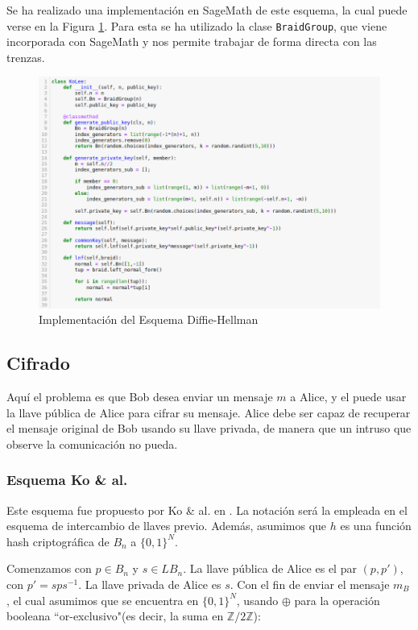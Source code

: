 \documentclass[12pt]{book}
\theoremstyle{definition}
\begin{document}
Se ha realizado una implementación en SageMath de este esquema, la cual puede verse en la Figura \ref{img:imp_ko}. Para esta se ha utilizado la clase \texttt{BraidGroup}, que viene incorporada con SageMath y nos permite trabajar de forma directa con las trenzas.
\begin{figure}
\includegraphics[scale=0.5]{imgs/KoLee.png}
\caption{Implementación del Esquema Diffie-Hellman}
\label{img:imp_ko}
\end{figure}

\subsection{Cifrado}
Aquí el problema es que Bob desea enviar un mensaje $m$ a Alice, y el puede usar la llave pública de Alice para cifrar su mensaje. Alice debe ser capaz de recuperar el mensaje original de Bob usando su llave privada, de manera que un intruso que observe la comunicación no pueda.

\subsubsection*{Esquema Ko \& al.}
Este esquema fue propuesto por Ko \& al. en \cite{Ko}. La notación será la empleada en el esquema de intercambio de llaves previo. Además, asumimos que $h$ es una función hash criptográfica de $B_n$ a $\{0,1\}^N$.

Comenzamos con $p\in B_n$ y $s\in LB_n$. La llave pública de Alice es el par $(p,p')$, con $p'=sps^{-1}$. La llave privada de Alice es $s$. Con el fin de enviar el mensaje $m_B$, el cual asumimos que se encuentra en $\{0,1\}^N$, usando $\oplus$ para la operación booleana ``or-exclusivo"(es decir, la suma en $\mathbb{Z}/2\mathbb{Z}$):
\end{document}
